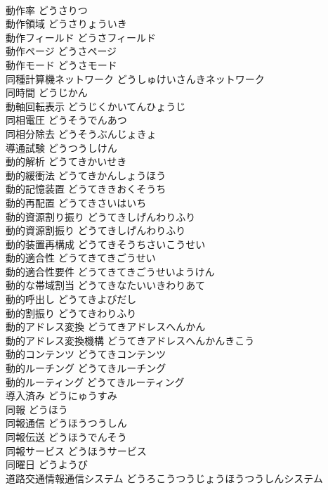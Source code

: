 \documentclass[8pt]{extreport}
\begin{document}
\begin{CJK}{UTF8}{min}
\\	動作率	どうさりつ	
\\	動作領域	どうさりょういき	
\\	動作フィールド	どうさフィールド	
\\	動作ページ	どうさページ	
\\	動作モード	どうさモード	
\\	同種計算機ネットワーク	どうしゅけいさんきネットワーク	
\\	同時間	どうじかん	
\\	動軸回転表示	どうじくかいてんひょうじ	
\\	同相電圧	どうそうでんあつ	
\\	同相分除去	どうそうぶんじょきょ	
\\	導通試験	どうつうしけん	
\\	動的解析	どうてきかいせき	
\\	動的緩衝法	どうてきかんしょうほう	
\\	動的記憶装置	どうてききおくそうち	
\\	動的再配置	どうてきさいはいち	
\\	動的資源割り振り	どうてきしげんわりふり	
\\	動的資源割振り	どうてきしげんわりふり	
\\	動的装置再構成	どうてきそうちさいこうせい	
\\	動的適合性	どうてきてきごうせい	
\\	動的適合性要件	どうてきてきごうせいようけん	
\\	動的な帯域割当	どうてきなたいいきわりあて	
\\	動的呼出し	どうてきよびだし	
\\	動的割振り	どうてきわりふり	
\\	動的アドレス変換	どうてきアドレスへんかん	
\\	動的アドレス変換機構	どうてきアドレスへんかんきこう	
\\	動的コンテンツ	どうてきコンテンツ	
\\	動的ルーチング	どうてきルーチング	
\\	動的ルーティング	どうてきルーティング	
\\	導入済み	どうにゅうすみ	
\\	同報	どうほう	
\\	同報通信	どうほうつうしん	
\\	同報伝送	どうほうでんそう	
\\	同報サービス	どうほうサービス	
\\	同曜日	どうようび	
\\	道路交通情報通信システム	どうろこうつうじょうほうつうしんシステム	

\end{CJK}
\end{document}
